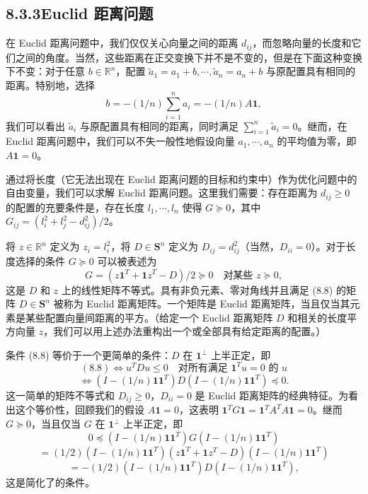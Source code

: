 \documentclass[UTF8, 12pt, fontset=fandol, oneside]{ctexart}
\begin{document}
\subsection*{8.3.3\quad Euclid 距离问题}

在 Euclid 距离问题中，我们仅仅关心向量之间的距离 $d_{ij}$，而忽略向量的长度和它们之间的角度。当然，这些距离在正交变换下并不是不变的，但是在下面这种变换下不变：对于任意 $b\in\mathbb{R}^n$，配置 $\tilde{a}_1=a_1+b,\cdots,\tilde{a}_n=a_n+b$ 与原配置具有相同的距离。特别地，选择
\[
b=-(1/n)\sum_{i=1}^n a_i=-(1/n)A\mathbf{1},
\]
我们可以看出 $\tilde{a}_i$ 与原配置具有相同的距离，同时满足 $\sum_{i=1}^n \tilde{a}_i=0$。继而，在 Euclid 距离问题中，我们可以不失一般性地假设向量 $a_1,\cdots,a_n$ 的平均值为零，即 $A\mathbf{1}=0$。

通过将长度（它无法出现在 Euclid 距离问题的目标和约束中）作为优化问题中的自由变量，我们可以求解 Euclid 距离问题。这里我们需要：存在距离为 $d_{ij}\geq 0$ 的配置的充要条件是，存在长度 $l_1,\cdots,l_n$ 使得 $G\succeq 0$，其中 $G_{ij}=(l_i^2+l_j^2-d_{ij}^2)/2$。

将 $z\in\mathbb{R}^n$ 定义为 $z_i=l_i^2$，将 $D\in\mathbf{S}^n$ 定义为 $D_{ij}=d_{ij}^2$（当然，$D_{ii}=0$）。对于长度选择的条件 $G\succeq 0$ 可以被表述为
\begin{equation}
G=(z\mathbf{1}^T+\mathbf{1}z^T-D)/2\succeq 0\quad \text{对某些 } z\succeq 0,
\tag{8.8}
\end{equation}
这是 $D$ 和 $z$ 上的线性矩阵不等式。具有非负元素、零对角线并且满足 (8.8) 的矩阵 $D\in\mathbf{S}^n$ 被称为 Euclid 距离矩阵。一个矩阵是 Euclid 距离矩阵，当且仅当其元素是某些配置向量间距离的平方。（给定一个 Euclid 距离矩阵 $D$ 和相关的长度平方向量 $z$，我们可以用上述办法重构出一个或全部具有给定距离的配置。）

条件 (8.8) 等价于一个更简单的条件：$D$ 在 $\mathbf{1}^\perp$ 上半正定，即
\[
(8.8)\Longleftrightarrow u^TDu\leq 0\quad \text{对所有满足 } \mathbf{1}^Tu=0 \text{ 的 } u
\]
\[
\Longleftrightarrow (I-(1/n)\mathbf{1}\mathbf{1}^T)D(I-(1/n)\mathbf{1}\mathbf{1}^T)\preceq 0.
\]
这一简单的矩阵不等式和 $D_{ij}\geq 0$，$D_{ii}=0$ 是 Euclid 距离矩阵的经典特征。为看出这个等价性，回顾我们的假设 $A\mathbf{1}=0$，这表明 $\mathbf{1}^TG\mathbf{1}=\mathbf{1}^TA^TA\mathbf{1}=0$。继而 $G\succeq 0$，当且仅当 $G$ 在 $\mathbf{1}^\perp$ 上半正定，即
\[
0\preceq (I-(1/n)\mathbf{1}\mathbf{1}^T)G(I-(1/n)\mathbf{1}\mathbf{1}^T)
\]
\[
=(1/2)(I-(1/n)\mathbf{1}\mathbf{1}^T)(z\mathbf{1}^T+\mathbf{1}z^T-D)(I-(1/n)\mathbf{1}\mathbf{1}^T)
\]
\[
=-(1/2)(I-(1/n)\mathbf{1}\mathbf{1}^T)D(I-(1/n)\mathbf{1}\mathbf{1}^T),
\]
这是简化了的条件。
\end{document}
